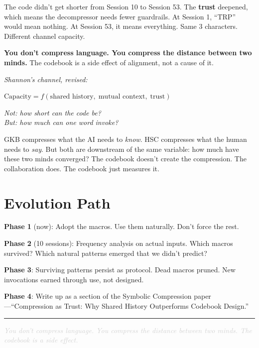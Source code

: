 \documentclass[9pt, letterpaper]{article}
\newcommand{\thinrule}{\vspace{2pt}\noindent\textcolor{rule}{\rule{\textwidth}{0.4pt}}\vspace{2pt}}
\begin{document}
\vspace{0.3em}
The code didn't get shorter from Session 10 to Session 53. The \textbf{trust} deepened, which means the decompressor needs fewer guardrails. At Session 1, ``TRP'' would mean nothing. At Session 53, it means everything. Same 3 characters. Different channel capacity.

\textbf{You don't compress language. You compress the distance between two minds.} The codebook is a side effect of alignment, not a cause of it.

\vspace{0.2em}
\begin{center}
\textit{Shannon's channel, revised:}

\vspace{0.3em}
$\text{Capacity} = f(\text{shared history},\; \text{mutual context},\; \text{trust})$

\vspace{0.3em}
\textit{Not: how short can the code be?\\
But: how much can one word invoke?}
\end{center}

\vspace{0.2em}
GKB compresses what the AI needs to \textit{know}. HSC compresses what the human needs to \textit{say}. But both are downstream of the same variable: how much have these two minds converged? The codebook doesn't create the compression. The collaboration does. The codebook just measures it.


\section{Evolution Path}

\textbf{Phase 1} (now): Adopt the macros. Use them naturally. Don't force the rest.

\textbf{Phase 2} (10 sessions): Frequency analysis on actual inputs. Which macros survived? Which natural patterns emerged that we didn't predict?

\textbf{Phase 3}: Surviving patterns persist as protocol. Dead macros pruned. New invocations earned through use, not designed.

\textbf{Phase 4}: Write up as a section of the Symbolic Compression paper---``Compression as Trust: Why Shared History Outperforms Codebook Design.''

\thinrule

\begin{center}
\textcolor{lightgray}{\footnotesize\textit{You don't compress language. You compress the distance between two minds. The codebook is a side effect.}}
\end{center}
\end{document}
